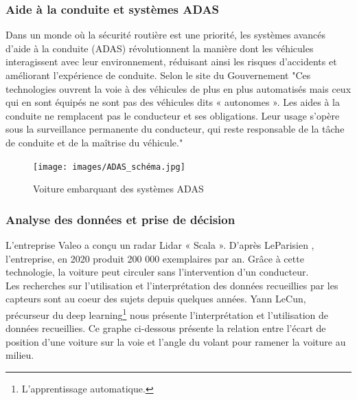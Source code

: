 \subsubsection{Aide à la conduite et systèmes ADAS}
Dans un monde où la sécurité routière est une priorité, les systèmes avancés d’aide à la conduite (ADAS) révolutionnent la manière dont les véhicules interagissent avec leur environnement, réduisant ainsi les risques d’accidents et améliorant l’expérience de conduite.
Selon le site du Gouvernement \cite{adas_gouv} "Ces technologies ouvrent la voie à des véhicules de plus en plus automatisés mais ceux qui en sont équipés ne sont pas des véhicules dits « autonomes ». Les aides à la conduite ne remplacent pas le conducteur et ses obligations. Leur usage s’opère sous la surveillance permanente du conducteur, qui reste responsable de la tâche de conduite et de la maîtrise du véhicule."
\begin{figure}[H]
    \centering
    \texttt{[image: images/ADAS\_schéma.jpg]} 
    \caption{Voiture embarquant des systèmes ADAS\cite{continental_adas}}
\end{figure}


\subsubsection{Analyse des données et prise de décision}
L'entreprise Valeo a conçu un radar Lidar « Scala ». D'après LeParisien \cite{le_parisien_radar_2019}, l'entreprise, en 2020 produit 200 000 exemplaires par an. Grâce à cette technologie, la voiture peut circuler sans l’intervention d’un conducteur.\\
Les recherches sur l'utilisation et l'interprétation des données recueillies par les capteurs sont au coeur des sujets depuis quelques années. Yann LeCun, précurseur du deep learning\footnote{L'apprentissage automatique.} nous présente l'interprétation et l'utilisation de données recueillies.
Ce graphe ci-dessous présente la relation entre l’écart de position d’une voiture sur la voie et l’angle du volant pour ramener la voiture au milieu. 

